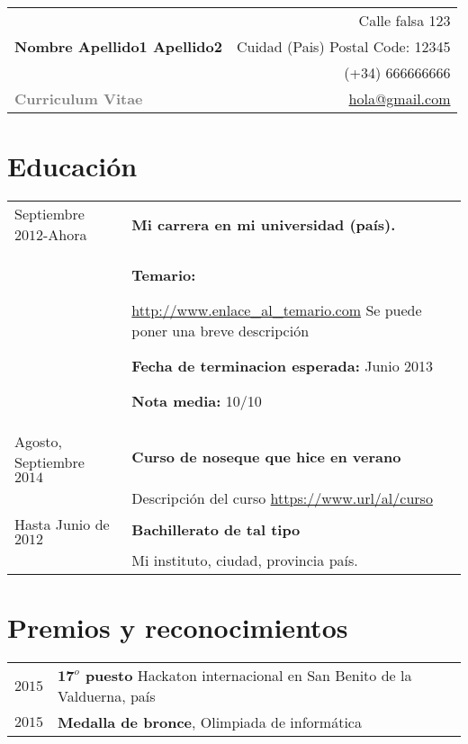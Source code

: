 \documentclass[11pt]{article}
\theoremstyle{plain}
\theoremstyle{definition}
\begin{document}
\begin{tabular}{l r}

\multirow{3}{*}{\Huge \textbf{Nombre Apellido1 Apellido2}} 

										& \small Calle falsa 123 \\
										& \small Cuidad (Pais) Postal Code: 12345\\
										& \small \Mobilefone \ \ (+34) 666666666 \\
\huge \textcolor{gray}{\textbf{Curriculum Vitae}}					&\small \Letter \ \ \href{mailto:hola@gmail.com}{hola@gmail.com}

\end{tabular}


\section*{\color{mygreen}Educación}
	
\begin{tabular}{p{2cm} p{13.5cm}}	
Septiembre $2012$-Ahora		& \textbf{Mi carrera en mi universidad (país). } 
\\
							& \textbf{Temario:}
							
							\url{http://www.enlace_al_temario.com} Se puede poner una breve descripción
							
							\textbf{Fecha de terminacion esperada:} Junio 2013 
							
							\textbf{Nota media:} 10/10
\\

Agosto, Septiembre $2014$ 	& \textbf{Curso de noseque que hice en verano}
\\
							& Descripción del curso \url{https://www.url/al/curso}
\\

Hasta Junio de $2012$ 			& \textbf{Bachillerato de tal tipo} 
\\

							& Mi instituto, ciudad, provincia país.
\\
\end{tabular}

\section*{\color{mygreen}Premios y reconocimientos} %
\begin{tabular}{r p{14cm}}
$2015$ & \textbf{$\textbf{17}^{o}$ puesto} Hackaton internacional en San Benito de la Valduerna, país
\\

$2015$ &\textbf{Medalla de bronce}, Olimpiada de informática
\\
\end{tabular}
\end{document}
